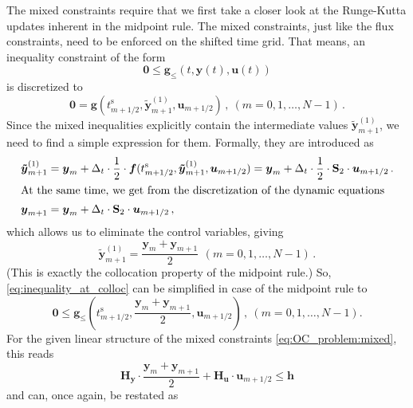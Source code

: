\documentclass{article}
\newcommand{\vectorfont}[1]{\boldsymbol{#1}}%
\newcommand{\greekvectorfont}[1]{\boldsymbol{#1}}%
\newcommand{\matrixfont}[1]{\mathbf{#1}}%
\newcommand{\fvec}{\vectorfont{f}}
\newcommand{\gvec}{\vectorfont{g}}
\newcommand{\hvec}{\vectorfont{h}}
\newcommand{\uvec}{\vectorfont{u}}
\newcommand{\yvec}{\vectorfont{y}}
\newcommand{\tildeyvec}{\vectorfont{\tilde{y}}}
\newcommand{\nullvec}{\greekvectorfont{0}}
\newcommand{\Hmat}{\matrixfont{H}}
\newcommand{\Smat}{\matrixfont{S}}
\begin{document}
The mixed constraints require that we first take a closer look at the Runge-Kutta updates inherent in the midpoint rule.
The mixed constraints, just like the flux constraints, need to be enforced on the shifted time grid.
That means, an inequality constraint of the form
\[
\nullvec \leq \gvec_{\leq} (t, \yvec(t), \uvec(t))
\]
is discretized to
\begin{equation}
\nullvec = \gvec (t_{m+1/2}^{\mathrm{s}}, \tildeyvec_{m+1}^{(1)}, \uvec_{m+1/2})\,,~(m = 0,1,\ldots,N-1)\,.
\label{eq:inequality_at_colloc}
\end{equation}
Since the mixed inequalities explicitly contain the intermediate values $\tildeyvec_{m+1}^{(1)}$, we need to find a simple expression for them.
Formally, they are introduced as
\begin{align*}
\tildeyvec_{m+1}^{(1)} &= \yvec_m + \Delta_t \cdot \frac{1}{2} \cdot \fvec (t_{m+1/2}^{\mathrm{s}}, \tildeyvec_{m+1}^{(1)}, \uvec_{m+1/2})
  = \yvec_m + \Delta_t \cdot \frac{1}{2} \cdot \Smat_2 \cdot \uvec_{m+1/2}\,.
\\
\intertext{At the same time, we get from the discretization of the dynamic equations}
\yvec_{m+1} &= \yvec_m + \Delta_t \cdot \Smat_2 \cdot \uvec_{m+1/2}\,,
\end{align*}
which allows us to eliminate the control variables, giving
\[
\tildeyvec_{m+1}^{(1)} = \frac{\yvec_m + \yvec_{m+1}}{2}\,~(m = 0,1,\ldots,N-1)\,.
\]
(This is exactly the collocation property of the midpoint rule.)
So, \eqref{eq:inequality_at_colloc} can be simplified in case of the midpoint rule to
\[
\nullvec \leq \gvec_{\leq} \left(t_{m+1/2}^{\mathrm{s}}, \frac{\yvec_m+\yvec_{m+1}}{2}, \uvec_{m+1/2} \right)\,,~(m=0,1,\ldots,N-1).
\]
For the given linear structure of the mixed constraints \eqref{eq:OC_problem:mixed}, this reads
\[
\Hmat_{\yvec} \cdot \frac{\yvec_m+\yvec_{m+1}}{2}  + \Hmat_{\uvec}\cdot  \uvec_{m+1/2} \leq \hvec
\]
and can, once again, be restated as
\end{document}
